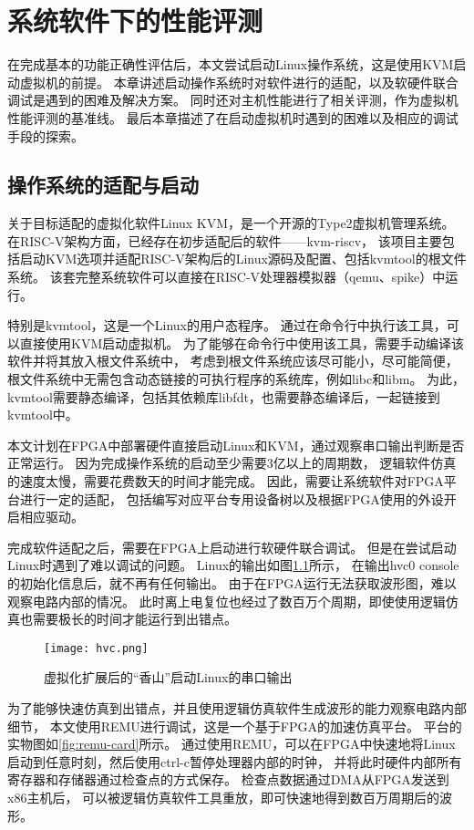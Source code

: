 \chapter{系统软件下的性能评测}

在完成基本的功能正确性评估后，本文尝试启动Linux操作系统，这是使用KVM启动虚拟机的前提。
本章讲述启动操作系统时对软件进行的适配，以及软硬件联合调试是遇到的困难及解决方案。
同时还对主机性能进行了相关评测，作为虚拟机性能评测的基准线。
最后本章描述了在启动虚拟机时遇到的困难以及相应的调试手段的探索。

\section{操作系统的适配与启动}
关于目标适配的虚拟化软件Linux KVM，是一个开源的Type2虚拟机管理系统。
在RISC-V架构方面，已经存在初步适配后的软件——kvm-riscv\cite{github:riscv-kvm}，
该项目主要包括启动KVM选项并适配RISC-V架构后的Linux源码及配置、包括kvmtool的根文件系统。
该套完整系统软件可以直接在RISC-V处理器模拟器（qemu、spike）中运行。

特别是kvmtool，这是一个Linux的用户态程序。
通过在命令行中执行该工具，可以直接使用KVM启动虚拟机。
为了能够在命令行中使用该工具，需要手动编译该软件并将其放入根文件系统中，
考虑到根文件系统应该尽可能小，尽可能简便，
根文件系统中无需包含动态链接的可执行程序的系统库，例如libc和libm。
为此，kvmtool需要静态编译，包括其依赖库libfdt，也需要静态编译后，一起链接到kvmtool中。

本文计划在FPGA中部署硬件直接启动Linux和KVM，通过观察串口输出判断是否正常运行。
因为完成操作系统的启动至少需要3亿以上的周期数，
逻辑软件仿真的速度太慢，需要花费数天的时间才能完成。
因此，需要让系统软件对FPGA平台进行一定的适配，
包括编写对应平台专用设备树以及根据FPGA使用的外设开启相应驱动。

完成软件适配之后，需要在FPGA上启动进行软硬件联合调试。
但是在尝试启动Linux时遇到了难以调试的问题。
Linux的输出如图\ref{fig:console-block}所示，
在输出hvc0 console的初始化信息后，就不再有任何输出。
由于在FPGA运行无法获取波形图，难以观察电路内部的情况。
此时离上电复位也经过了数百万个周期，即使使用逻辑仿真也需要极长的时间才能运行到出错点。

\begin{figure}[htbp]
    \centering
\texttt{[image: hvc.png]}
    \caption{虚拟化扩展后的“香山”启动Linux的串口输出}
    \label{fig:console-block}
\end{figure}

为了能够快速仿真到出错点，并且使用逻辑仿真软件生成波形的能力观察电路内部细节，
本文使用REMU\cite{iccd2023remu}进行调试，这是一个基于FPGA的加速仿真平台。
平台的实物图如\ref{fig:remu-card}所示。
通过使用REMU，可以在FPGA中快速地将Linux启动到任意时刻，然后使用ctrl-c暂停处理器内部的时钟，
并将此时硬件内部所有寄存器和存储器通过检查点的方式保存。
检查点数据通过DMA从FPGA发送到x86主机后，
可以被逻辑仿真软件工具重放，即可快速地得到数百万周期后的波形。

